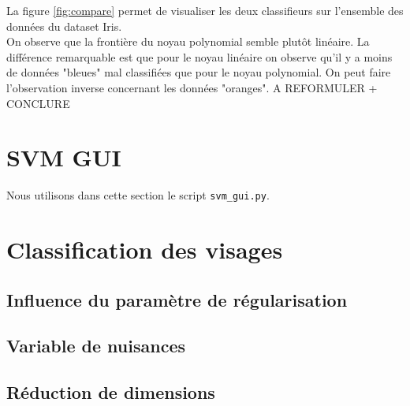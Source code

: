 \documentclass[a4paper,12pt]{article}
\begin{document}
La figure \ref{fig:compare} permet de visualiser les deux classifieurs sur l'ensemble des données du dataset Iris.\\
On observe que la frontière du noyau polynomial semble plutôt linéaire.
La différence remarquable est que pour le noyau linéaire on observe qu'il y a moins de données "bleues" mal classifiées que pour le noyau polynomial.
On peut faire l'observation inverse concernant les données "oranges".
A REFORMULER + CONCLURE 

\section{SVM GUI}

Nous utilisons dans cette section le script \texttt{svm\_gui.py}.\\

\section{Classification des visages}

\subsection{Influence du paramètre de régularisation}

\subsection{Variable de nuisances}

\subsection{Réduction de dimensions}
\end{document}
